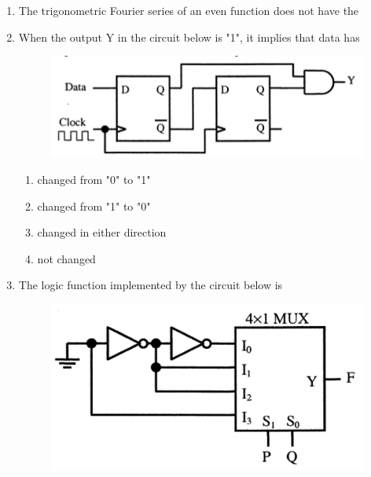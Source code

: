 \documentclass[a4paper, 11pt]{article}
\begin{document}
\begin{enumerate}
    \hfill{}

    \item The trigonometric Fourier series of an even function does not have the
    
    \begin{enumerate}
    \end{enumerate}

    \hfill{}

    \item When the output Y in the circuit below is "1", it implies that data has
    
    \begin{figure}[H]
        \centering
        \includegraphics[width=0.7\columnwidth]{figs/q6.png}
        \caption*{}
        \label{fig:q6}
    \end{figure}
    
    \begin{enumerate}
        \item changed from "0" to "1"
        \item changed from "1" to "0"
        \item changed in either direction
        \item not changed
    \end{enumerate}

    \hfill{}

    \item The logic function implemented by the circuit below is 
    
    \begin{figure}[H]
        \centering
        \includegraphics[width=0.6\columnwidth]{figs/q7.png}
        \caption*{}
        \label{fig:q7}
    \end{figure}
    

\end{enumerate}
\end{document}
